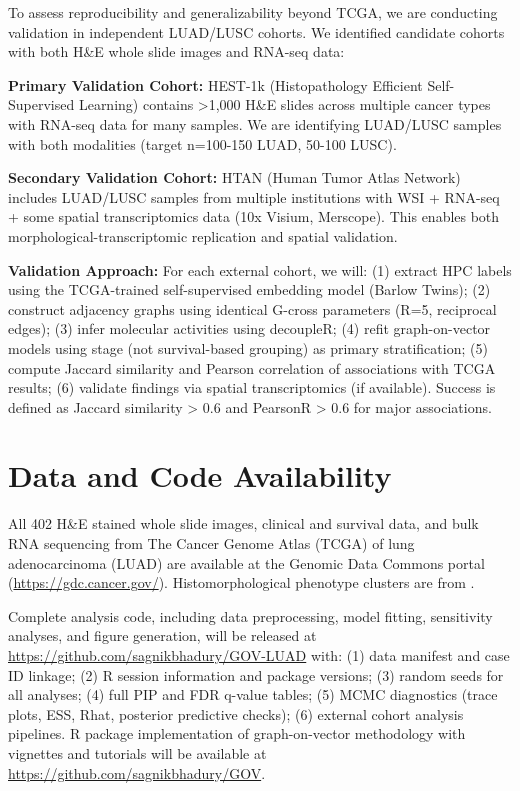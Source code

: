 \documentclass[pdflatex,article,12pt]{article}
\begin{document}
To assess reproducibility and generalizability beyond TCGA, we are conducting validation in independent LUAD/LUSC cohorts. We identified candidate cohorts with both H\&E whole slide images and RNA-seq data:

\textbf{Primary Validation Cohort:} HEST-1k (Histopathology Efficient Self-Supervised Learning) contains >1,000 H\&E slides across multiple cancer types with RNA-seq data for many samples. We are identifying LUAD/LUSC samples with both modalities (target n=100-150 LUAD, 50-100 LUSC).

\textbf{Secondary Validation Cohort:} HTAN (Human Tumor Atlas Network) includes LUAD/LUSC samples from multiple institutions with WSI + RNA-seq + some spatial transcriptomics data (10x Visium, Merscope). This enables both morphological-transcriptomic replication and spatial validation.

\textbf{Validation Approach:} For each external cohort, we will: (1) extract HPC labels using the TCGA-trained self-supervised embedding model (Barlow Twins); (2) construct adjacency graphs using identical G-cross parameters (R=5, reciprocal edges); (3) infer molecular activities using decoupleR; (4) refit graph-on-vector models using stage (not survival-based grouping) as primary stratification; (5) compute Jaccard similarity and Pearson correlation of associations with TCGA results; (6) validate findings via spatial transcriptomics (if available). Success is defined as Jaccard similarity > 0.6 and PearsonR > 0.6 for major associations.

\section{Data and Code Availability}

All 402 H\&E stained whole slide images, clinical and survival data, and bulk RNA sequencing from The Cancer Genome Atlas (TCGA) of lung adenocarcinoma (LUAD) are available at the Genomic Data Commons portal (\url{https://gdc.cancer.gov/}). Histomorphological phenotype clusters are from \cite{claudio2024mapping}.

Complete analysis code, including data preprocessing, model fitting, sensitivity analyses, and figure generation, will be released at \url{https://github.com/sagnikbhadury/GOV-LUAD} with: (1) data manifest and case ID linkage; (2) R session information and package versions; (3) random seeds for all analyses; (4) full PIP and FDR q-value tables; (5) MCMC diagnostics (trace plots, ESS, Rhat, posterior predictive checks); (6) external cohort analysis pipelines. R package implementation of graph-on-vector methodology with vignettes and tutorials will be available at \url{https://github.com/sagnikbhadury/GOV}.
\end{document}
